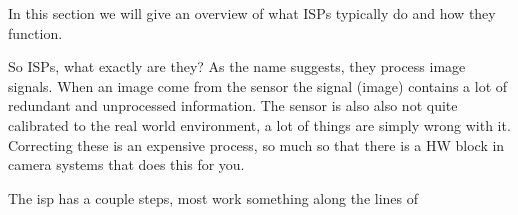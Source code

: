 In this section we will give an overview of what ISPs typically do and how they
function.

So ISPs, what exactly are they? As the name suggests, they process image
signals. When an image come from the sensor the signal (image) contains a lot
of redundant and unprocessed information. The sensor is also also not quite
calibrated to the real world environment, a lot of things are simply wrong with
it. Correcting these is an expensive process, so much so that there is a HW
block in camera systems that does this for you.

The isp has a couple steps, most work something along the lines of

\begin{figure}[htpb]
    \centering
    \qquad
    \qquad
    \qquad
\end{figure}
